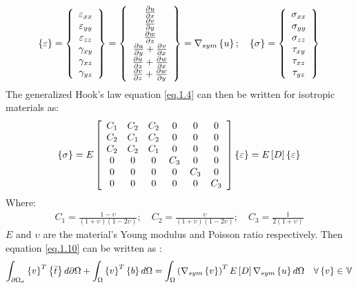 \begin{eqnarray}
\left\lbrace{\varepsilon}\right \rbrace=\left\lbrace \begin{array}{c}
\varepsilon_{xx}\\ \varepsilon_{yy}\\ \varepsilon_{zz}\\ \gamma_{xy} \\ \gamma_{xz}\\ \gamma_{yz}
\end{array} \right \rbrace=\left\lbrace \begin{array}{c}
\frac{\partial u}{\partial x}\\ \frac{\partial v}{\partial y}\\ \frac{\partial w}{\partial z}\\ \frac{\partial u}{\partial y}+\frac{\partial v}{\partial x} \\ \frac{\partial u}{\partial z}+\frac{\partial w}{\partial x}\\ \frac{\partial v}{\partial z}+\frac{\partial w}{\partial y}
\end{array} \right \rbrace = \nabla_{sym}\left\lbrace{u}\right \rbrace ;\quad \left\lbrace{\sigma}\right \rbrace=\left\lbrace \begin{array}{c}
\sigma_{xx}\\ \sigma_{yy}\\ \sigma_{zz}\\ \tau_{xy} \\ \tau_{xz}\\ \tau_{yz}
\end{array} \right \rbrace
\end{eqnarray}
The generalized Hook's law equation \ref{eq.1.4} can then be written for isotropic materials as:
\begin{equation}
\left\lbrace{\sigma}\right \rbrace=E \left[{\begin{array}{cccccc}
	C_1 & C_2 & C_2 & 0 & 0 & 0\\
	C_2 & C_1 & C_2 & 0 & 0& 0 \\
	C_2 & C_2 & C_1  & 0 & 0& 0 \\
	0 & 0& 0& C_3 & 0 & 0 \\
	0& 0& 0& 0& C_3 & 0 \\
	0 & 0 & 0 & 0 & 0 & C_3
	\end{array}}\right] \left\lbrace{\varepsilon}\right \rbrace=E\left[{D}\right]\left\lbrace{\varepsilon}\right \rbrace
\end{equation}
Where:
\begin{eqnarray}
C_1=\frac{1-\upsilon}{(1+\upsilon)(1-2\upsilon)}; \quad C_2=\frac{\upsilon}{(1+\upsilon)(1-2\upsilon)}; \quad C_3=\frac{1}{2(1+\upsilon)}
\end{eqnarray}
$E$ and $\upsilon$ are the material's Young modulus and Poisson ratio respectively. Then equation \ref{eq.1.10} can be written as :
\begin{eqnarray}
\label{eq.1.11b}
\int_{\partial \Omega_{\sigma}}{\left\lbrace{v}\right \rbrace^T \left\lbrace{\bar{t}}\right \rbrace d\partial \Omega}+\int_{\Omega}{\left\lbrace{v}\right \rbrace^T \left\lbrace{b}\right \rbrace d\Omega}=\int_{\Omega}{\left(\nabla_{sym}\left\lbrace{v}\right \rbrace\right)^T E\left[{D}\right] \nabla_{sym}\left\lbrace{u}\right \rbrace d\Omega}\quad \forall \left\lbrace{v}\right \rbrace \in \mathbb{V}
\end{eqnarray}
